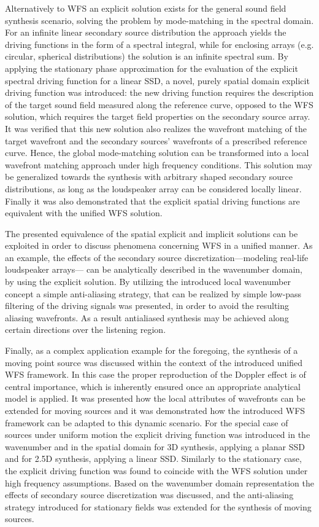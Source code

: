 Alternatively to WFS an explicit solution exists for the general sound field synthesis scenario, solving the problem by mode-matching in the spectral domain.
For an infinite linear secondary source distribution the approach yields the driving functions in the form of a spectral integral, while for enclosing arrays (e.g. circular, spherical distributions) the solution is an infinite spectral sum.
By applying the stationary phase approximation for the evaluation of the explicit spectral driving function for a linear SSD, a novel, purely spatial domain explicit driving function was introduced: the new driving function requires the description of the target sound field measured along the reference curve, opposed to the WFS solution, which requires the target field properties on the secondary source array.
It was verified that this new solution also realizes the wavefront matching of the target wavefront and the secondary sources' wavefronts of a prescribed reference curve.
Hence, the global mode-matching solution can be transformed into a local wavefront matching approach under high frequency conditions.
This solution may be generalized towards the synthesis with arbitrary shaped secondary source distributions, as long as the loudspeaker array can be considered locally linear.
Finally it was also demonstrated that the explicit spatial driving functions are equivalent with the unified WFS solution.

The presented equivalence of the spatial explicit and implicit solutions can be exploited in order to discuss phenomena concerning WFS in a unified manner.
As an example, the effects of the secondary source discretization---modeling real-life loudspeaker arrays--- can be analytically described in the wavenumber domain, by using the explicit solution.
By utilizing the introduced local wavenumber concept a simple anti-aliasing strategy, that can be realized by simple low-pass filtering of the driving signals was presented, in order to avoid the resulting aliasing wavefronts.
As a result antialiased synthesis may be achieved along certain directions over the listening region.

Finally, as a complex application example for the foregoing, the synthesis of a moving point source was discussed within the context of the introduced unified WFS framework.
In this case the proper reproduction of the Doppler effect is of central importance, which is inherently ensured once an appropriate analytical model is applied.
It was presented how the local attributes of wavefronts can be extended for moving sources and it was demonstrated how the introduced WFS framework can be adapted to this dynamic scenario.
For the special case of sources under uniform motion the explicit driving function was introduced in the wavenumber and in the spatial domain for 3D synthesis, applying a planar SSD and for 2.5D synthesis, applying a linear SSD.
Similarly to the stationary case, the explicit driving function was found to coincide with the WFS solution under high frequency assumptions.
Based on the wavenumber domain representation the effects of secondary source discretization was discussed, and the anti-aliasing strategy introduced for stationary fields was extended for the synthesis of moving sources.

